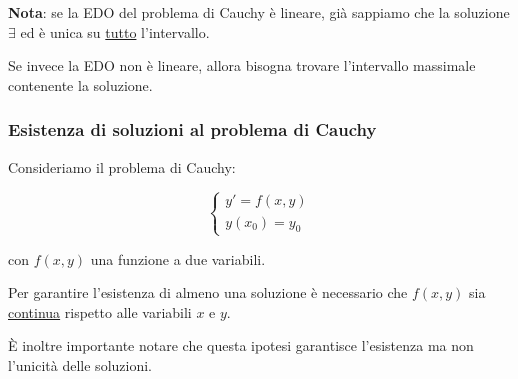 \textbf{Nota}: se la EDO del problema di Cauchy è lineare, già sappiamo che la soluzione \(\exists{}\) ed è unica su \underline{tutto} l'intervallo.

Se invece la EDO non è lineare, allora bisogna trovare l'intervallo massimale contenente la soluzione.

\subsubsection{Esistenza di soluzioni al problema di Cauchy}

Consideriamo il problema di Cauchy:

\begin{equation*}
    \begin{cases*}
        y' = f(x,y) \\
        y(x_0) = y_0
    \end{cases*}
\end{equation*}

con \(f(x,y)\) una funzione a due variabili.

Per garantire l'esistenza di almeno una soluzione è necessario che \(f(x,y)\) sia \underline{continua} rispetto alle variabili \(x\) e \(y\).

È inoltre importante notare che questa ipotesi garantisce l'esistenza ma non l'unicità delle soluzioni.

